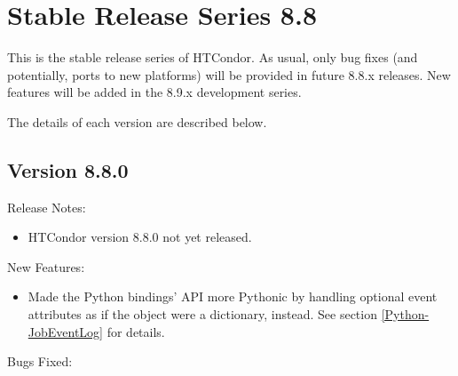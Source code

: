 
\section{Stable Release Series 8.8}\label{sec:History-8-8}

This is the stable release series of HTCondor.
As usual, only bug fixes (and potentially, ports to new platforms)
will be provided in future 8.8.x releases.
New features will be added in the 8.9.x development series.

The details of each version are described below.

\subsection*{\label{sec:New-8-8-0}Version 8.8.0}

\noindent Release Notes:

\begin{itemize}

\item HTCondor version 8.8.0 not yet released.

\end{itemize}


\noindent New Features:

\begin{itemize}

\item Made the Python bindings'  API more Pythonic by
handling optional event attributes as if the  object
were a dictionary, instead.  See section \ref{Python-JobEventLog} for details.

\end{itemize}

\noindent Bugs Fixed:

